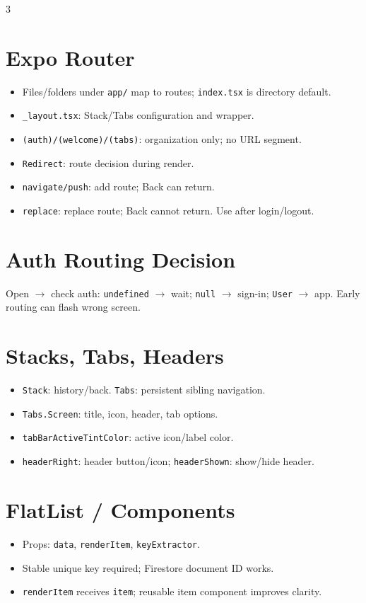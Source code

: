 \documentclass[10pt,a4paper]{article}
\begin{document}
\begin{multicols}{3}
\section*{Expo Router}
\begin{itemize}
  \item Files/folders under \texttt{app/} map to routes; \texttt{index.tsx} is directory default.
  \item \texttt{\_layout.tsx}: Stack/Tabs configuration and wrapper.
  \item \texttt{(auth)/(welcome)/(tabs)}: organization only; no URL segment.
  \item \texttt{Redirect}: route decision during render.
  \item \texttt{navigate/push}: add route; Back can return.
  \item \texttt{replace}: replace route; Back cannot return. Use after login/logout.
\end{itemize}

\section*{Auth Routing Decision}
Open $\rightarrow$ check auth: \texttt{undefined} $\rightarrow$ wait; \texttt{null} $\rightarrow$ sign-in; \texttt{User} $\rightarrow$ app. Early routing can flash wrong screen.

\section*{Stacks, Tabs, Headers}
\begin{itemize}
  \item \texttt{Stack}: history/back. \texttt{Tabs}: persistent sibling navigation.
  \item \texttt{Tabs.Screen}: title, icon, header, tab options.
  \item \texttt{tabBarActiveTintColor}: active icon/label color.
  \item \texttt{headerRight}: header button/icon; \texttt{headerShown}: show/hide header.
\end{itemize}

\section*{FlatList / Components}
\begin{itemize}
  \item Props: \texttt{data}, \texttt{renderItem}, \texttt{keyExtractor}.
  \item Stable unique key required; Firestore document ID works.
  \item \texttt{renderItem} receives \texttt{item}; reusable item component improves clarity.
\end{itemize}


\end{multicols}
\end{document}
